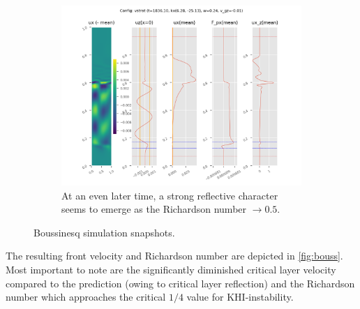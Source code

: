 \documentclass[twocolumn,
        usenames, %
        dvipsnames %
    ]{revtex4-1}%
\begin{document}
\begin{figure}[h]
    \begin{subfigure}{0.5\textwidth}
        \centering
        \includegraphics[width=\textwidth]{plots/vstrat_3.png}
        \caption{At an even later time, a strong reflective character seems to
        emerge as the Richardson number $\to 0.5$.}
    \end{subfigure}
    \caption{Boussinesq simulation snapshots.}\label{fig:bouss_1}
\end{figure}
The resulting front velocity and Richardson number are depicted in
\autoref{fig:bouss}. Most important to note are the significantly diminished
critical layer velocity compared to the prediction (owing to critical layer
reflection) and the Richardson number which approaches the critical $1/4$ value
for KHI-instability.
\end{document}
